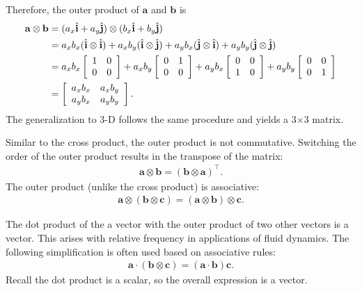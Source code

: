 Therefore, the outer product of $\mathbf{a}$ and $\mathbf{b}$ is
\begin{align}
  \mathbf{a} \otimes \mathbf{b} 
  &= ( a_x \hat{\mathbf{i}} + a_y \hat{\mathbf{j}} ) \otimes ( b_x \hat{\mathbf{i}} + b_y \hat{\mathbf{j}} ) \nonumber \\
  &= a_x b_x ( \hat{\mathbf{i}} \otimes \hat{\mathbf{i}} ) + a_x b_y ( \hat{\mathbf{i}} \otimes \hat{\mathbf{j}} ) + a_y b_x ( \hat{\mathbf{j}} \otimes \hat{\mathbf{i}} ) + a_y b_y ( \hat{\mathbf{j}} \otimes \hat{\mathbf{j}} ) \nonumber \\
  &= a_x b_x \left[ \begin{array}{c c} 1 & 0 \\ 0 & 0 \end{array} \right] 
   + a_x b_y \left[ \begin{array}{c c} 0 & 1 \\ 0 & 0 \end{array} \right]
   + a_y b_x \left[ \begin{array}{c c} 0 & 0 \\ 1 & 0 \end{array} \right] 
   + a_y b_y \left[ \begin{array}{c c} 0 & 0 \\ 0 & 1 \end{array} \right] \nonumber \\
  &= \left[ \begin{array}{c c} a_x b_x & a_x b_y \\ a_y b_x & a_y b_y \end{array} \right] .
\end{align}
The generalization to 3-D follows the same procedure and yields a 3$\times$3 matrix.

Similar to the cross product, the outer product is not commutative. Switching the order of the outer product results in the transpose of the matrix:
\begin{align}
  \mathbf{a} \otimes \mathbf{b} = ( \mathbf{b} \otimes \mathbf{a} )^\top .
\end{align}
The outer product (unlike the cross product) is associative:
\begin{align}
  \mathbf{a} \otimes ( \mathbf{b} \otimes \mathbf{c} ) = ( \mathbf{a} \otimes \mathbf{b} ) \otimes \mathbf{c} .
\end{align}

The dot product of the a vector with the outer product of two other vectors is a vector. This arises with relative frequency in applications of fluid dynamics. The following simplification is often used based on associative rules:
\begin{align}
  \mathbf{a} \cdot ( \mathbf{b} \otimes \mathbf{c} ) = ( \mathbf{a} \cdot \mathbf{b} ) \mathbf{c} .
\end{align}
Recall the dot product is a scalar, so the overall expression is a vector.

